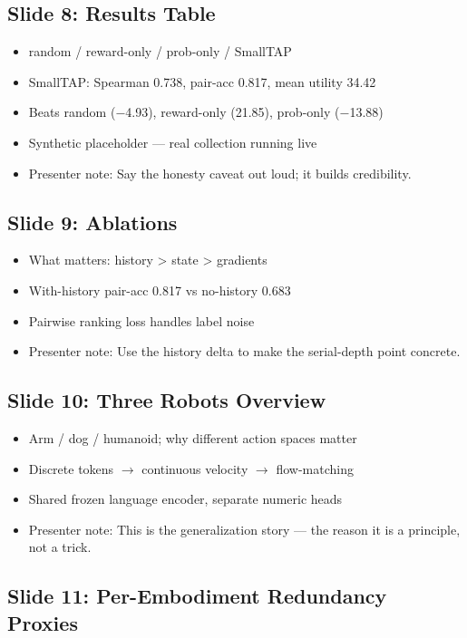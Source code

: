 \documentclass[11pt,letterpaper]{article}
\begin{document}
\subsection*{Slide 8: Results Table}

\begin{itemize}
\item random / reward-only / prob-only / SmallTAP
\item SmallTAP: Spearman 0.738, pair-acc 0.817, mean utility 34.42
\item Beats random ($-$4.93), reward-only (21.85), prob-only ($-$13.88)
\item Synthetic placeholder --- real collection running live
\item Presenter note: Say the honesty caveat out loud; it builds credibility.
\end{itemize}

\subsection*{Slide 9: Ablations}

\begin{itemize}
\item What matters: history > state > gradients
\item With-history pair-acc 0.817 vs no-history 0.683
\item Pairwise ranking loss handles label noise
\item Presenter note: Use the history delta to make the serial-depth point concrete.
\end{itemize}

\subsection*{Slide 10: Three Robots Overview}

\begin{itemize}
\item Arm / dog / humanoid; why different action spaces matter
\item Discrete tokens $\rightarrow$ continuous velocity $\rightarrow$ flow-matching
\item Shared frozen language encoder, separate numeric heads
\item Presenter note: This is the generalization story --- the reason it is a principle, not a trick.
\end{itemize}

\subsection*{Slide 11: Per-Embodiment Redundancy Proxies}
\end{document}
